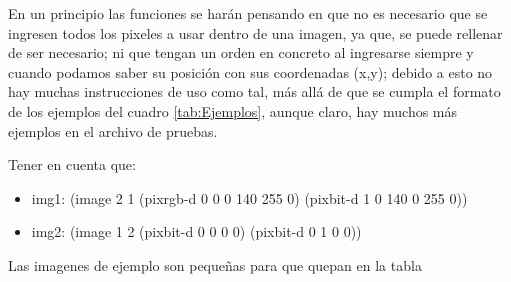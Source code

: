 En un principio las funciones se harán pensando en que no es necesario que se ingresen todos 
los pixeles a usar dentro de una imagen, ya que, se puede rellenar de ser necesario; ni que 
tengan un orden en concreto al ingresarse siempre y cuando podamos saber su posición con sus coordenadas 
(x,y); debido a esto no hay muchas instrucciones de uso como tal, más allá de que se cumpla el formato 
de los ejemplos del cuadro \ref{tab:Ejemplos}, aunque claro, hay muchos más ejemplos en el archivo de pruebas.

Tener en cuenta que:
\begin{itemize}
    \item img1: (image 2 1 (pixrgb-d 0 0 0 140 255 0) (pixbit-d 1 0 140 0 255 0))
    \item img2: (image 1 2 (pixbit-d 0 0 0 0) (pixbit-d 0 1 0 0))
\end{itemize}
Las imagenes de ejemplo son pequeñas para que quepan en la tabla